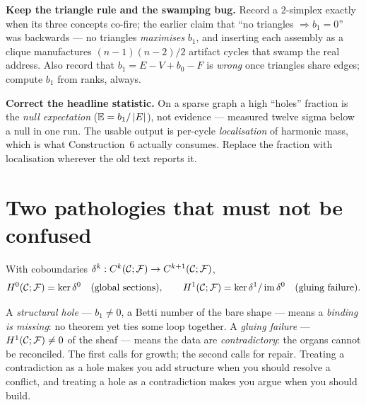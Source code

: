 \begin{workplan}{\Recast}
{  \item \textbf{Keep the triangle rule and the swamping bug.} Record a
    $2$-simplex exactly when its three concepts co-fire; the earlier claim
    that ``no triangles $\Rightarrow b_1 = 0$'' was backwards --- no triangles
    \emph{maximises} $b_1$, and inserting each assembly as a clique
    manufactures $(n-1)(n-2)/2$ artifact cycles that swamp the real address.
    Also record that $b_1 = E - V + b_0 - F$ is \emph{wrong} once triangles
    share edges; compute $b_1$ from ranks, always.
  \item \textbf{Correct the headline statistic.} On a sparse graph a high
    ``holes'' fraction is the \emph{null expectation}
    ($\mathbb{E} = b_1/\left\lvert E \right\rvert$), not evidence --- measured twelve sigma below
    a null in one run. The usable output is per-cycle \emph{localisation} of
    harmonic mass, which is what Construction~6 actually consumes. Replace the
    fraction with localisation wherever the old text reports it.
}

\end{workplan}

\section{Two pathologies that must not be confused}

\begin{definition}\label{def:cohom}
With coboundaries $\delta^k:C^{k}(\mathcal{C};\mathcal{F})\to C^{k+1}(\mathcal{C};\mathcal{F})$,
\[
  H^{0}(\mathcal{C};\mathcal{F})=\ker\delta^0\quad(\text{global sections}),
  \qquad
  H^{1}(\mathcal{C};\mathcal{F})=\ker\delta^1/\operatorname{im}\delta^0\quad(\text{gluing failure}).
\]
\end{definition}

\begin{intu}\Intu
A \emph{structural hole} --- $b_1\neq0$, a Betti number of the bare
shape --- means a \emph{binding is missing}: no theorem yet ties some
loop together. A \emph{gluing failure} --- $H^{1}(\mathcal{C};\mathcal{F})\neq0$ of the sheaf ---
means the data are \emph{contradictory}: the organs cannot be
reconciled. The first calls for growth; the second calls for repair.
Treating a contradiction as a hole makes you add structure when you
should resolve a conflict, and treating a hole as a contradiction makes
you argue when you should build.
\end{intu}

